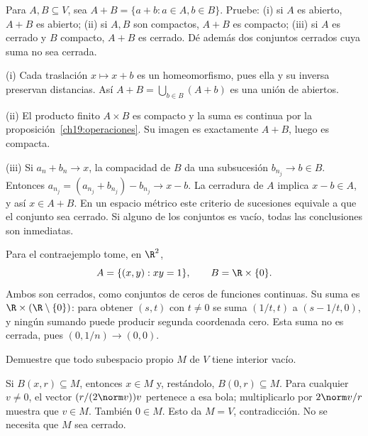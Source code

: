 \begin{ejercicio}\label{ej:lectura-19-2}
Para $A,B\subseteq V$, sea $A+B=\{a+b:a\in A,b\in B\}$. Pruebe: (i) si $A$ es abierto, $A+B$ es abierto; (ii) si $A,B$ son compactos, $A+B$ es compacto; (iii) si $A$ es cerrado y $B$ compacto, $A+B$ es cerrado. Dé además dos conjuntos cerrados cuya suma no sea cerrada.
\end{ejercicio}
\begin{solucion}
(i) Cada traslación $x\mapsto x+b$ es un homeomorfismo, pues ella y su inversa preservan distancias. Así $A+B=\bigcup_{b\in B}(A+b)$ es una unión de abiertos.

(ii) El producto finito $A\times B$ es compacto y la suma es continua por la proposición~\ref{ch19:operaciones}. Su imagen es exactamente $A+B$, luego es compacta.

(iii) Si $a_n+b_n\to x$, la compacidad de $B$ da una subsucesión $b_{n_j}\to b\in B$. Entonces $a_{n_j}=(a_{n_j}+b_{n_j})-b_{n_j}\to x-b$. La cerradura de $A$ implica $x-b\in A$, y así $x\in A+B$. En un espacio métrico este criterio de sucesiones equivale a que el conjunto sea cerrado. Si alguno de los conjuntos es vacío, todas las conclusiones son inmediatas.

Para el contraejemplo tome, en $\R^2$,
\[
 A=\{(x,y):xy=1\},\qquad B=\R\times\{0\}.
\]
Ambos son cerrados, como conjuntos de ceros de funciones continuas. Su suma es $\R\times(\R\setminus\{0\})$: para obtener $(s,t)$ con $t\ne0$ se suma $(1/t,t)$ a $(s-1/t,0)$, y ningún sumando puede producir segunda coordenada cero. Esta suma no es cerrada, pues $(0,1/n)\to(0,0)$.
\end{solucion}

\begin{ejercicio}\label{ej:lectura-19-3}
Demuestre que todo subespacio propio $M$ de $V$ tiene interior vacío.
\end{ejercicio}
\begin{solucion}
Si $B(x,r)\subseteq M$, entonces $x\in M$ y, restándolo, $B(0,r)\subseteq M$. Para cualquier $v\ne0$, el vector $(r/(2\norm v))v$ pertenece a esa bola; multiplicarlo por $2\norm v/r$ muestra que $v\in M$. También $0\in M$. Esto da $M=V$, contradicción. No se necesita que $M$ sea cerrado.
\end{solucion}

